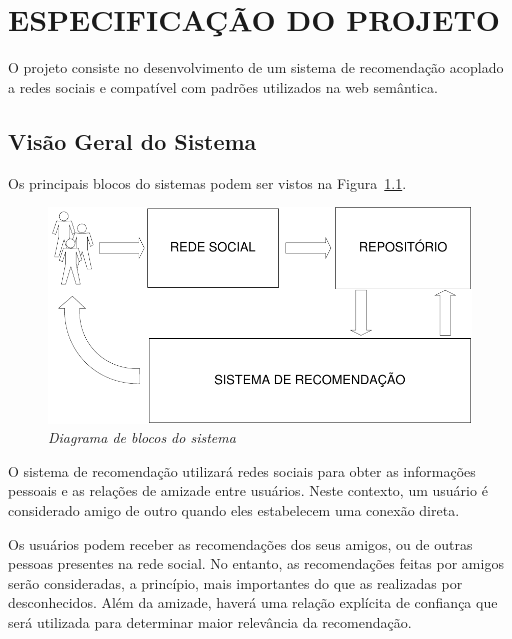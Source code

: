 \chapter{ESPECIFICAÇÃO DO PROJETO} %
\label{cha:especificacao_do_projeto}

 O projeto consiste no desenvolvimento de um sistema de recomendação acoplado a redes sociais e compatível com padrões utilizados na web semântica.

\section{Visão Geral do Sistema} %
\label{sec:visao_do_sistema}
Os principais blocos do sistemas podem ser vistos na Figura~\ref{fig:escopo}.

\begin{figure}
  \centering
  \includegraphics[width=\textwidth]{imagens/Diagrama_Visao_Geral}
  \caption{\it Diagrama de blocos do sistema}
  \label{fig:escopo}
\end{figure}


O sistema de recomendação utilizará redes sociais para obter as informações pessoais e as relações de amizade entre usuários. Neste contexto, um usuário é considerado amigo de outro quando eles estabelecem uma conexão direta.

Os usuários podem receber as recomendações dos seus amigos, ou de outras pessoas presentes na rede social. No entanto, as recomendações feitas por amigos serão consideradas, a princípio, mais importantes do que as realizadas por desconhecidos. Além da amizade, haverá uma relação explícita de confiança que será utilizada para determinar maior relevância da recomendação.


